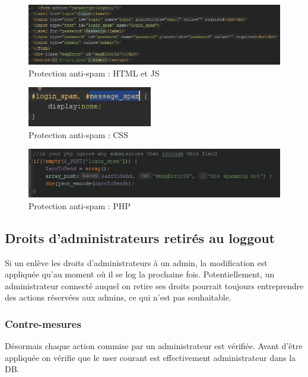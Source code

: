 \documentclass[12pt]{article}
\begin{document}
\begin{figure}[H]
\centering
\includegraphics[width=\linewidth]{images/noSpamLoginFormHTMLJS.jpg}
\caption{Protection anti-spam : HTML et JS}
\end{figure}
\begin{figure}[H]
\centering
\includegraphics[width=\linewidth]{images/noSpamLoginFormCSS.jpg}
\caption{Protection anti-spam : CSS}
\end{figure}
\begin{figure}[H]
\centering
\includegraphics[width=\linewidth]{images/noSpamLoginFormPHP.jpg}
\caption{Protection anti-spam : PHP}
\end{figure}

\subsection{Droits d'administrateurs retirés au loggout}
Si un enlève les droits d'administrateurs à un admin, la modification est appliquée qu'au moment où il se log la prochaine fois. Potentiellement, un administrateur connecté auquel on retire ses droits pourrait toujours entreprendre des actions réservées aux admins, ce qui n'est pas souhaitable.

\subsubsection{Contre-mesures}
Désormais chaque action commise par un administrateur est vérifiée. Avant d'être appliquée on vérifie que le user courant est effectivement administrateur dans la DB.
\end{document}
